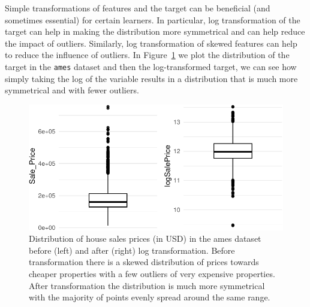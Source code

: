 Simple transformations of features and the target can be beneficial (and
sometimes essential) for certain learners. In particular, log
transformation of the target can help in making the distribution more
symmetrical and can help reduce the impact of outliers. Similarly, log
transformation of skewed features can help to reduce the influence of
outliers. In Figure~\ref{fig-sale} we plot the distribution of the
target in the \texttt{ames} dataset and then the log-transformed target,
we can see how simply taking the log of the variable results in a
distribution that is much more symmetrical and with fewer outliers.

\begin{Shaded}
\begin{Highlighting}[]

\OtherTok{=} 
\NormalTok{log\_ames[, logSalePrice }\SpecialCharTok{:}\ErrorTok{=} \NormalTok{(Sale\_Price)]}
\NormalTok{(} \NormalTok{)) }\SpecialCharTok{+}
  \NormalTok{(} \NormalTok{))}
\end{Highlighting}
\end{Shaded}

\begin{figure}

{\centering \includegraphics[width=1\textwidth,height=\textheight]{chapters/chapter9/preprocessing_files/figure-pdf/fig-sale-1.pdf}

}

\caption{\label{fig-sale}Distribution of house sales prices (in USD) in
the ames dataset before (left) and after (right) log transformation.
Before transformation there is a skewed distribution of prices towards
cheaper properties with a few outliers of very expensive properties.
After transformation the distribution is much more symmetrical with the
majority of points evenly spread around the same range.}

\end{figure}

